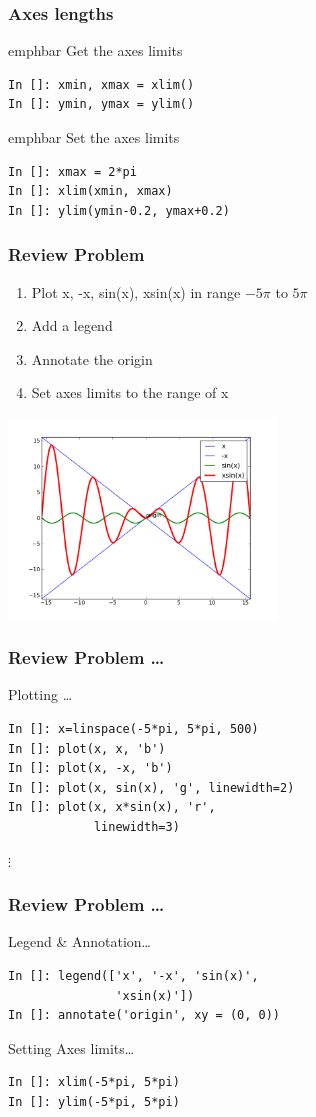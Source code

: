 \documentclass[14pt,compress]{beamer}
\newcommand{\emphbar}[1]
{\begin{beamercolorbox}[rounded=true]{emphbar} 
      {#1}
 \end{beamercolorbox}
}
\begin{document}
\begin{frame}[fragile]
\frametitle{Axes lengths}
\emphbar{Get the axes limits}
  \begin{lstlisting}
In []: xmin, xmax = xlim() 
In []: ymin, ymax = ylim() 
  \end{lstlisting}
\emphbar{Set the axes limits}
  \begin{lstlisting}
In []: xmax = 2*pi
In []: xlim(xmin, xmax) 
In []: ylim(ymin-0.2, ymax+0.2) 
  \end{lstlisting}
\end{frame}

\begin{frame}[fragile]
\frametitle{Review Problem}
\begin{enumerate}
\item Plot x, -x, sin(x), xsin(x) in range $-5\pi$ to $5\pi$
\item Add a legend
\item Annotate the origin
\item Set axes limits to the range of x
\end{enumerate}
\vspace*{-0.1in}
\begin{center}
  \includegraphics[height=2.1in, interpolate=true]{data/four_plot}  
\end{center}
\end{frame}

\begin{frame}[fragile]
\frametitle{Review Problem \ldots}
\alert{Plotting \ldots}
\begin{lstlisting}
In []: x=linspace(-5*pi, 5*pi, 500)
In []: plot(x, x, 'b')
In []: plot(x, -x, 'b')
In []: plot(x, sin(x), 'g', linewidth=2)
In []: plot(x, x*sin(x), 'r', 
            linewidth=3)
\end{lstlisting}
$\vdots$
\end{frame}

\begin{frame}[fragile]
\frametitle{Review Problem \ldots}
\alert{Legend \& Annotation\ldots}
\begin{lstlisting}
In []: legend(['x', '-x', 'sin(x)', 
               'xsin(x)'])
In []: annotate('origin', xy = (0, 0))
\end{lstlisting}
\alert{Setting Axes limits\ldots}
\begin{lstlisting}
In []: xlim(-5*pi, 5*pi)
In []: ylim(-5*pi, 5*pi)
\end{lstlisting}
\end{frame}
\end{document}
